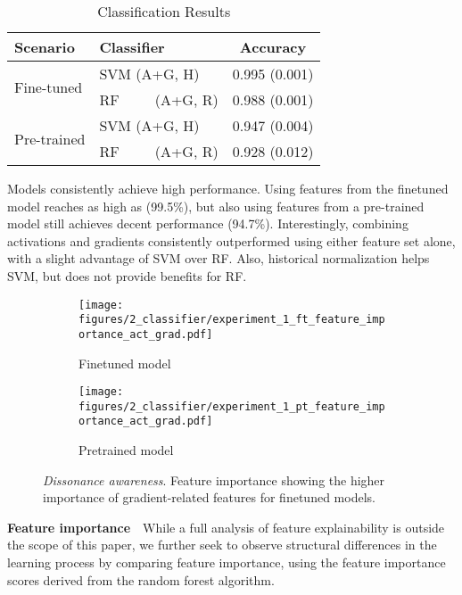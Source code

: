 \begin{table}[h]
\vspace{-0.3cm}
\centering
\caption{Classification Results}
\label{tab:classification_results}
\begin{tabular}{llc}
\toprule
\bf Scenario &  \bf Classifier & \bf Accuracy \\
\midrule
\multirow{2}{*}{Fine-tuned} & SVM (A+G, H) & 0.995 (0.001)\\
& RF~~~~~(A+G, R) & 0.988 (0.001)  \\
\midrule
\multirow{2}{*}{Pre-trained} & SVM (A+G, H) & 0.947 (0.004)\\
& RF~~~~~(A+G, R) & 0.928 (0.012)  \\
\bottomrule
\end{tabular}
 \vspace{-0.6cm}
\end{table}

Models consistently achieve high performance. Using features from the finetuned model reaches as high as (99.5\%), but also using features from a pre-trained model still achieves decent performance (94.7\%). Interestingly, combining activations and gradients consistently outperformed using either feature set alone, with a slight advantage of SVM over RF. Also, historical normalization helps SVM, but does not provide benefits for RF.
 

\begin{figure*}[h]
\centering
\begin{subfigure}{.5\textwidth}
  \centering
  \texttt{[image: figures/2\_classifier/experiment\_1\_ft\_feature\_importance\_act\_grad.pdf]}
  \caption{Finetuned model}
  \label{fig:feature_importance_ft}
\end{subfigure}%
\begin{subfigure}{.5\textwidth}
  \centering
  \texttt{[image: figures/2\_classifier/experiment\_1\_pt\_feature\_importance\_act\_grad.pdf]}
  \caption{Pretrained model}
  \label{fig:feature_importance_pt}
\end{subfigure}
\caption{\textit{Dissonance awareness}. Feature importance showing the higher importance of gradient-related features for finetuned models.}\label{fig:feature_importance} %
\end{figure*}

\textbf{Feature importance}\ \  
While a full analysis of feature explainability is outside the scope of this paper, we further seek to observe structural differences in the learning process by comparing feature importance, using the feature importance scores derived from the random forest algorithm.

